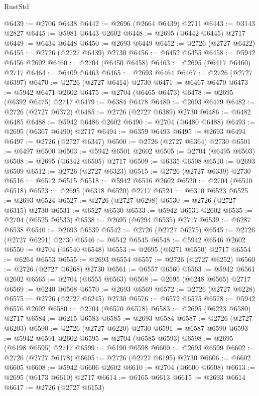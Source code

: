 \begin{lexlean}{RustStd}
\begin{coremodule}
@6439 := @2706 @6438
@6442 := @2696 (@2664 @6439) @2711
@6443 := @3143 @2827
@6445 := @5981 @6443 @2602
@6448 := @2695 (@6442 @6445) @2717
@6449 := @6434 @6448
@6450 := @2693 @6449
@6452 := @2726 (@2727 @6422)
@6455 := @2726 (@2727 @6439) @2730
@6456 := @6452 @6455
@6458 := @5942 @6456 @2602
@6460 := @2704 (@6450 @6458)
@6463 := @2695 (@6417 @6460) @2717
@6464 := @6409 @6463
@6465 := @2693 @6464
@6467 := @2726 (@2727 @6397)
@6470 := @2726 (@2727 @6414) @2730
@6471 := @6467 @6470
@6473 := @5942 @6471 @2602
@6475 := @2704 (@6465 @6473)
@6478 := @2695 (@6392 @6475) @2717
@6479 := @6384 @6478
@6480 := @2693 @6479
@6482 := @2726 (@2727 @6372)
@6485 := @2726 (@2727 @6389) @2730
@6486 := @6482 @6485
@6488 := @5942 @6486 @2602
@6490 := @2704 (@6480 @6488)
@6493 := @2695 (@6367 @6490) @2717
@6494 := @6359 @6493
@6495 := @2693 @6494
@6497 := @2726 (@2727 @6347)
@6500 := @2726 (@2727 @6364) @2730
@6501 := @6497 @6500
@6503 := @5942 @6501 @2602
@6505 := @2704 (@6495 @6503)
@6508 := @2695 (@6342 @6505) @2717
@6509 := @6335 @6508
@6510 := @2693 @6509
@6512 := @2726 (@2727 @6323)
@6515 := @2726 (@2727 @6339) @2730
@6516 := @6512 @6515
@6518 := @5942 @6516 @2602
@6520 := @2704 (@6510 @6518)
@6523 := @2695 (@6318 @6520) @2717
@6524 := @6310 @6523
@6525 := @2693 @6524
@6527 := @2726 (@2727 @6298)
@6530 := @2726 (@2727 @6315) @2730
@6531 := @6527 @6530
@6533 := @5942 @6531 @2602
@6535 := @2704 (@6525 @6533)
@6538 := @2695 (@6294 @6535) @2717
@6539 := @6287 @6538
@6540 := @2693 @6539
@6542 := @2726 (@2727 @6275)
@6545 := @2726 (@2727 @6291) @2730
@6546 := @6542 @6545
@6548 := @5942 @6546 @2602
@6550 := @2704 (@6540 @6548)
@6553 := @2695 (@6271 @6550) @2717
@6554 := @6264 @6553
@6555 := @2693 @6554
@6557 := @2726 (@2727 @6252)
@6560 := @2726 (@2727 @6268) @2730
@6561 := @6557 @6560
@6563 := @5942 @6561 @2602
@6565 := @2704 (@6555 @6563)
@6568 := @2695 (@6248 @6565) @2717
@6569 := @6240 @6568
@6570 := @2693 @6569
@6572 := @2726 (@2727 @6228)
@6575 := @2726 (@2727 @6245) @2730
@6576 := @6572 @6575
@6578 := @5942 @6576 @2602
@6580 := @2704 (@6570 @6578)
@6583 := @2695 (@6223 @6580) @2717
@6584 := @6215 @6583
@6585 := @2693 @6584
@6587 := @2726 (@2727 @6203)
@6590 := @2726 (@2727 @6220) @2730
@6591 := @6587 @6590
@6593 := @5942 @6591 @2602
@6595 := @2704 (@6585 @6593)
@6598 := @2695 (@6198 @6595) @2717
@6599 := @6190 @6598
@6600 := @2693 @6599
@6602 := @2726 (@2727 @6178)
@6605 := @2726 (@2727 @6195) @2730
@6606 := @6602 @6605
@6608 := @5942 @6606 @2602
@6610 := @2704 (@6600 @6608)
@6613 := @2695 (@6173 @6610) @2717
@6614 := @6165 @6613
@6615 := @2693 @6614
@6617 := @2726 (@2727 @6153)

\end{coremodule}
\end{lexlean}
